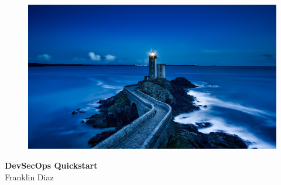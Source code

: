 \begin{titlepage}
    \centering
        \vspace{0mm}
            \begin{figure}[!h]
                \centering
                \includegraphics[scale=1.0]{../images/plouzane-1758197_1920.jpg}
            \end{figure}
        \vspace*{40mm} %
        \begin{flushright}
            \textbf{\textsf{\Huge {DevSecOps Quickstart}}}\\
            \vspace{5mm}
            \Large \textsf{Franklin Diaz}\\
            \vspace*{0mm}
        \end{flushright}
	\clearpage
		\vspace*{\fill}

\end{titlepage}

